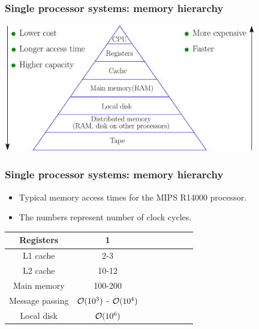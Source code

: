 \documentclass{beamer}
\begin{document}
\begin{frame}\frametitle{Single processor systems: memory hierarchy}
\begin{center}
\includegraphics[width=11cm]{MemoryHierarchy}
\end{center}
\end{frame}

\begin{frame}\frametitle{Single processor systems: memory hierarchy}
\begin{center}
\begin{itemize}
\item Typical memory access times for the MIPS R14000 processor. \\
\item The numbers represent number of clock cycles. 
\end{itemize}
\vspace{.5cm}

\end{center}
\begin{center}
\begin{tabular}{|c|c|c|c|c|c|c|c|} \hline
Registers & 1
  \\ \hline
L1 cache & 2-3
  \\ \hline
L2 cache & 10-12
  \\ \hline
Main memory &  100-200
  \\ \hline
Message passing & ${\cal O}(10^3)$ - ${\cal O}(10^4)$
\\ \hline
Local disk & ${\cal O}(10^6)$
  \\ \hline
\end{tabular}
\end{center}
\end{frame}
\end{document}
